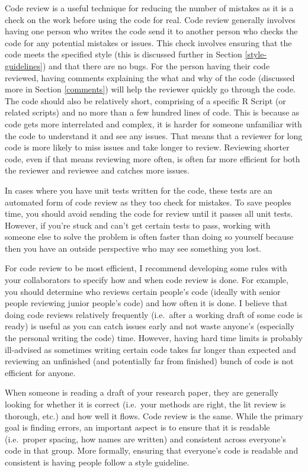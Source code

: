 \documentclass[
  12pt,
]{book}
\begin{document}
Code review is a useful technique for reducing the number of mistakes as it is a check on the work before using the code for real. Code review generally involves having one person who writes the code send it to another person who checks the code for any potential mistakes or issues. This check involves ensuring that the code meets the specified style (this is discussed further in Section \ref{style-guidelines}) and that there are no bugs. For the person having their code reviewed, having comments explaining the what and why of the code (discussed more in Section \ref{comments}) will help the reviewer quickly go through the code. The code should also be relatively short, comprising of a specific R Script (or related scripts) and no more than a few hundred lines of code. This is because as code gets more interrelated and complex, it is harder for someone unfamiliar with the code to understand it and see any issues. That means that a reviewer for long code is more likely to miss issues and take longer to review. Reviewing shorter code, even if that means reviewing more often, is often far more efficient for both the reviewer and reviewee and catches more issues.

In cases where you have unit tests written for the code, these tests are an automated form of code review as they too check for mistakes. To save peoples time, you should avoid sending the code for review until it passes all unit tests. However, if you're stuck and can't get certain tests to pass, working with someone else to solve the problem is often faster than doing so yourself because then you have an outside perspective who may see something you lost.

For code review to be most efficient, I recommend developing some rules with your collaborators to specify how and when code review is done. For example, you should determine who reviews certain people's code (ideally with senior people reviewing junior people's code) and how often it is done. I believe that doing code reviews relatively frequently (i.e.~after a working draft of some code is ready) is useful as you can catch issues early and not waste anyone's (especially the personal writing the code) time. However, having hard time limits is probably ill-advised as sometimes writing certain code takes far longer than expected and reviewing an unfinished (and potentially far from finished) bunch of code is not efficient for anyone.

When someone is reading a draft of your research paper, they are generally looking for whether it is correct (i.e.~your methods are right, the lit review is thorough, etc.) and how well it flows. Code review is the same. While the primary goal is finding errors, an important aspect is to ensure that it is readable (i.e.~proper spacing, how names are written) and consistent across everyone's code in that group. More formally, ensuring that everyone's code is readable and consistent is having people follow a style guideline.
\end{document}
